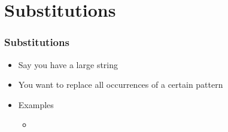 \section{Substitutions}

\frame{\tableofcontents[currentsection]}

\begin{frame}
    \frametitle{Substitutions}
    \begin{itemize}
      \item Say you have a large string
      \item You want to replace all occurrences of a certain pattern
      \item Examples
        \begin{itemize}
          \item
        \end{itemize}
    \end{itemize}
  \end{frame}